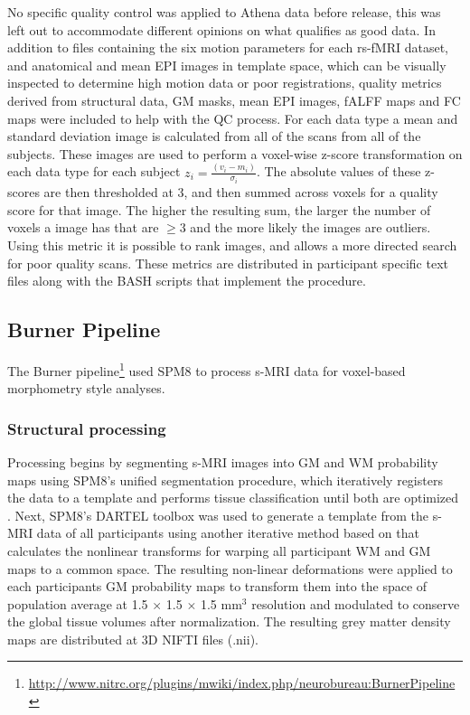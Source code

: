 \documentclass[preprint,12pt,3p]{elsarticle}
\begin{document}
\begin{itemize}
No specific quality control was applied to Athena data before release, this was left out to accommodate different opinions on what qualifies as good data. In addition to files containing the six motion parameters for each rs-fMRI dataset, and anatomical and mean EPI images in template space, which can be visually inspected to determine high motion data or poor registrations, quality metrics derived from structural data, GM masks, mean EPI images, fALFF maps and FC maps were included to help with the QC process. For each data type a mean and standard deviation image is calculated from all of the scans from all of the subjects. These images are used to perform a voxel-wise z-score transformation on each data type for each subject $z_i = \frac{(v_i-m_i)}{\sigma_i}$. The absolute values of these z-scores are then thresholded at 3, and then summed across voxels for a quality score for that image. The higher the resulting sum, the larger the number of voxels a image has that are $\geq 3$ and the more likely the images are outliers. Using this metric it is possible to rank images, and allows a more directed search for poor quality scans. These metrics are distributed in participant specific text files along with the BASH scripts that implement the procedure.

\subsection{Burner Pipeline}

The Burner pipeline\footnote{\url{http://www.nitrc.org/plugins/mwiki/index.php/neurobureau:BurnerPipeline}} used SPM8 \cite{ashburner2012spm8} to process s-MRI data for voxel-based morphometry \cite{ashburner2000vbm} style analyses.

\subsubsection{Structural processing} 

Processing begins by segmenting s-MRI images into GM and WM probability maps using SPM8's unified segmentation procedure, which iteratively registers the data to a template and performs tissue classification until both are optimized \cite{ashburner2005unified}. Next, SPM8's DARTEL toolbox \cite{ashburner2007dartel} was used to generate a template from the s-MRI data of all participants using another iterative method based on that calculates the nonlinear transforms for warping all participant WM and GM maps to a common space. The resulting non-linear deformations were applied to each participants GM probability maps to transform them into the space of population average at 1.5 $\times$ 1.5 $\times$ 1.5 mm$^3$ resolution and modulated to conserve the global tissue volumes after normalization. The resulting grey matter density maps are distributed at 3D NIFTI files (.nii).


\end{itemize}
\end{document}

